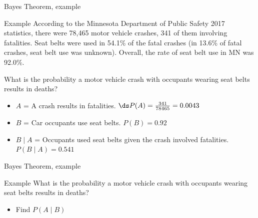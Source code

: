 \documentclass[xcolor=table, aspectratio=169, bigger]{beamer}
\begin{document}
\begin{frame}{Bayes Theorem, example}
\begin{exampleblock}{Example}
According to the Minnesota Department of Public Safety 2017 statistics, there were 78,465 motor vehicle crashes, 341 of them involving fatalities. Seat belts were used in 54.1\% of the fatal crashes (in 13.6\% of fatal crashes, seat belt use was unknown). Overall, the rate of seat belt use in MN was 92.0\%. \\ 
\medskip

What is the probability a motor vehicle crash with occupants wearing seat belts results in deaths?

\begin{itemize}
\pause\item $A$ = A crash results in fatalities. $\ds P(A) = \frac{341}{78465} = 0.0043$

\pause\item $B$ = Car occupants use seat belts. $P(B) = 0.92$

\pause\item $B \mid A$ = Occupants used seat belts given the crash involved fatalities.\\ \smallskip
$P(B \mid A) = 0.541$
\end{itemize}

\end{exampleblock}
\end{frame}

\begin{frame}{Bayes Theorem, example}
\begin{exampleblock}{Example}
What is the probability a motor vehicle crash with occupants wearing seat belts results in deaths?\\ \smallskip
{} \smallskip

\begin{itemize}
\pause\item Find $P(A \mid B)$ \\ \smallskip
\pause{} \medskip
\pause{}
\end{itemize}

\end{exampleblock}
\end{frame}
\end{document}
